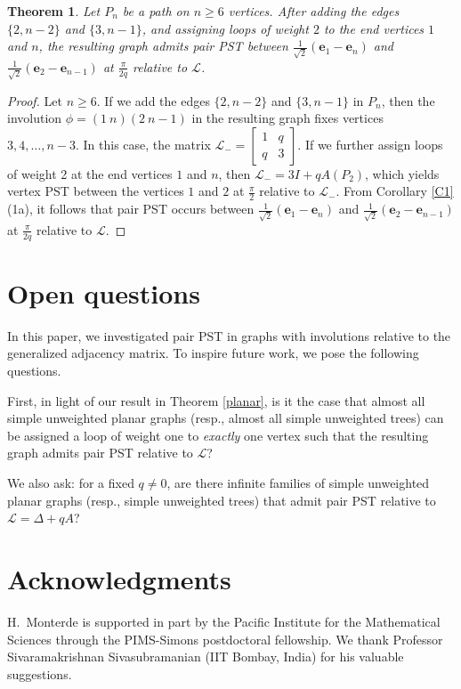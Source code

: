 \documentclass[12pt,a4paper]{article}
\newtheorem{thm}{Theorem}
\begin{document}
\begin{thm}
\label{n-2}
Let $P_n$ be a path on $n \geq 6$ vertices. After adding the edges $\{2,n-2\}$ and $\{3,n-1\}$, and assigning loops of weight $2$ to the end vertices $1$ and $n$, the resulting graph admits pair PST between $\frac{1}{\sqrt{2}}(\mathbf{e}_1 - \mathbf{e}_n)$ and $\frac{1}{\sqrt{2}}(\mathbf{e}_2 - \mathbf{e}_{n-1})$ at $\frac{\pi}{2q}$ relative to $\mathscr{L}$.
\end{thm}
\begin{proof}
Let $n \geq 6$. If we add the edges $\{2,n-2\}$ and $\{3,n-1\}$ in $P_n$, then the involution $\phi=(1 ~ n)(2 ~n-1)$ in the resulting graph fixes vertices $3,4,\ldots, n-3$. In this case, the matrix $\mathscr{L}_-=\begin{bmatrix}
    1& q\\ q &3
\end{bmatrix}$. 
If we further assign loops of weight 2 at the end vertices $1$ and $n$, then $\mathscr{L}_-=3I+qA(P_2)$, which yields vertex PST between the vertices $1$ and $2$ at $\frac{\pi}{2}$ relative to $\mathscr{L}_-$. From Corollary \ref{C1}(1a), it follows that pair PST occurs between $\frac{1}{\sqrt{2}}(\mathbf{e}_1 - \mathbf{e}_n)$ and $\frac{1}{\sqrt{2}}(\mathbf{e}_2 - \mathbf{e}_{n-1})$ at $\frac{\pi}{2q}$ relative to $\mathscr{L}$.      
\end{proof}


\section{Open questions}\label{sec6} 

In this paper, we investigated pair PST in graphs with involutions relative to the generalized adjacency matrix. To inspire future work, we pose the following questions.

First, in light of our result in Theorem \ref{planar}, is it the case that almost all simple unweighted planar graphs (resp., almost all simple unweighted trees) can be assigned a loop of weight one to \textit{exactly} one vertex such that the resulting graph admits pair PST relative to $\mathscr{L}$?

We also ask: for a fixed $q\neq 0$, are there infinite families of simple unweighted planar graphs (resp., simple unweighted trees) that admit pair PST relative to $\mathscr{L}=\Delta+qA$?

\section*{Acknowledgments}
H.~Monterde is supported in part by the Pacific Institute for the Mathematical Sciences through the PIMS-Simons postdoctoral fellowship. We thank Professor Sivaramakrishnan Sivasubramanian (IIT Bombay, India) for his valuable suggestions.



\end{document}
